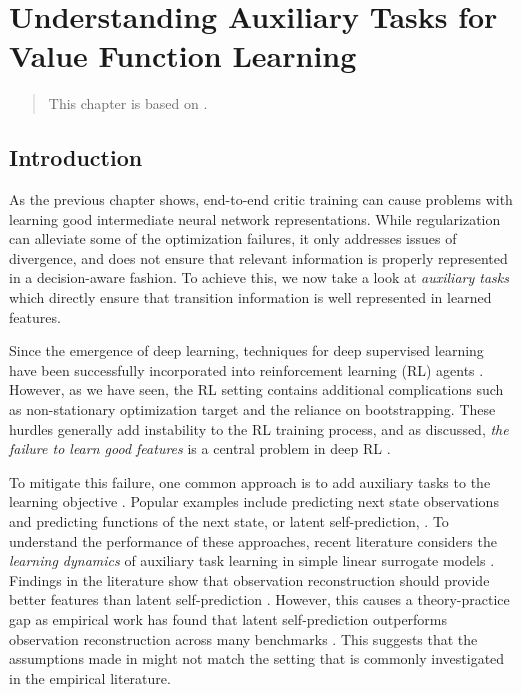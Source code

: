 \chapter{Understanding Auxiliary Tasks for Value Function Learning}
\label{chap:understanding}

\begin{quote}
    This chapter is based on .
\end{quote}

\section{Introduction}

As the previous chapter shows, end-to-end critic training can cause problems with learning good intermediate neural network representations.
While regularization can alleviate some of the optimization failures, it only addresses issues of divergence, and does not ensure that relevant information is properly represented in a decision-aware fashion.
To achieve this, we now take a look at \emph{auxiliary tasks} which directly ensure that transition information is well represented in learned features.

Since the emergence of deep learning, techniques for deep supervised learning have been successfully incorporated into reinforcement learning (RL) agents \parencite{dqn,ddpg}.
However, as we have seen, the RL setting contains additional complications such as non-stationary optimization target and the reliance on bootstrapping.
These hurdles generally add instability to the RL training process, and as discussed, \emph{the failure to learn good features} is a central problem in deep RL \parencite{kumar2021implicit,lyle2022understanding,nikishin2022primacy,hussing2024dissecting}.

To mitigate this failure, one common approach is to add auxiliary tasks to the learning objective \parencite{jaderberg2017reinforcement}. 
Popular examples include predicting next state observations \parencite{jaderberg2017reinforcement} and predicting functions of the next state, or latent self-prediction, \parencite{schwarzer2021dataefficient,ni2024bridging}.
To understand the performance of these approaches, recent literature \parencite{tang2022understanding,lelan2023bootstrapped} considers the \emph{learning dynamics} of auxiliary task learning in simple linear surrogate models \parencite{saxe2014exact}.
Findings in the literature show that observation reconstruction should provide better features than latent self-prediction \parencite{behzadian2019fast,tang2022understanding}. 
However, this causes a theory-practice gap as empirical work has found that latent self-prediction outperforms observation reconstruction across many benchmarks \parencite{schwarzer2021dataefficient,ni2024bridging}.
This suggests that the assumptions made in \textcite{behzadian2019fast,tang2022understanding} might not match the setting that is commonly investigated in the empirical literature.

